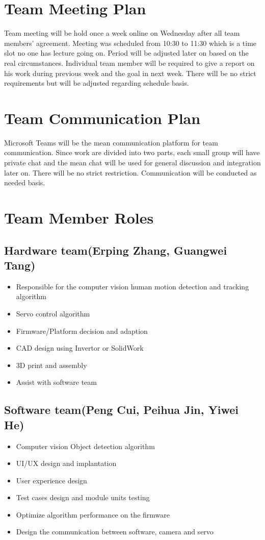 \documentclass{article}
\begin{document}
\begin{large}
\section{Team Meeting Plan}
\hspace*{1cm} Team meeting will be hold once a week online on Wednesday after all team members' agreement. Meeting was scheduled from 10:30 to 11:30 which is a time slot no one has lecture going on. Period will be adjusted later on based on the real circumstances. Individual team member will be required to give a report on his work during previous week and the goal in next week. There will be no strict requirements but will be adjusted regarding schedule basis.
 
\section{Team Communication Plan}
\hspace*{1cm} Microsoft Teams will be the mean communication platform for team communication. Since work are divided into two parts, each small group will have private chat and the mean chat will be used for general discussion and integration later on. There will be no strict restriction. Communication will be conducted as needed basis.
\section{Team Member Roles}
\subsection {Hardware team(Erping Zhang, Guangwei Tang)}
\begin{itemize}
	\item Responsible for the computer vision human motion detection and tracking algorithm
	\item Servo control algorithm 
	\item Firmware/Platform decision and adaption
	\item CAD design using Invertor or SolidWork
	\item3D print and assembly
	\item Assist with software team
\end{itemize}
	
\subsection{Software team(Peng Cui, Peihua Jin, Yiwei He)}
\begin{itemize}
    \item Computer vision Object detection algorithm
	\item UI/UX design and implantation
	\item User experience design
	\item Test cases design and module units testing
	\item Optimize algorithm performance on the firmware
	\item Design the communication between software, camera and servo


\end{itemize}
\end{large}
\end{document}
